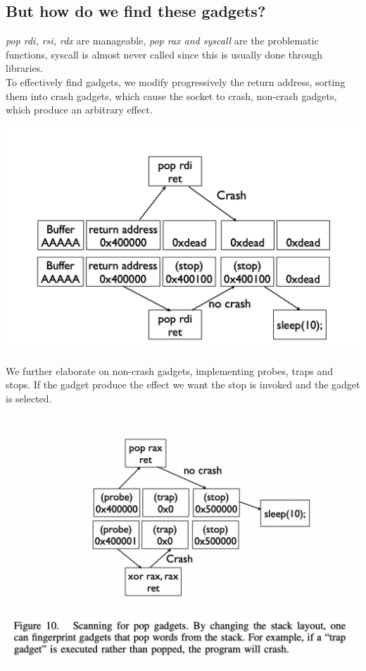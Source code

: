 \documentclass[11pt, oneside]{article}   	%
\begin{document}
\begin{enumerate}
\subsection*{But how do we find these gadgets?}
\emph{pop rdi, rsi, rdx} are manageable, \emph{pop rax and syscall} are the problematic functions, syscall is almost never called since this is usually done through libraries.\\
To effectively find gadgets, we modify progressively the return address, sorting them into crash gadgets, which cause the socket to crash, non-crash gadgets, which produce an arbitrary effect. 
\begin{center}
\includegraphics[scale = 0.5]{cgadg}
\end{center}
We further elaborate on non-crash gadgets, implementing probes, traps and stops. If the gadget produce the effect we want the stop is invoked and the gadget is selected.
\begin{center}
\includegraphics[scale = 0.4]{popstore}
\end{center}
\end{enumerate}
\end{document}
